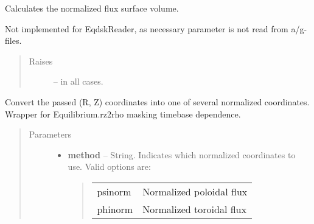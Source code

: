 \documentclass[letterpaper,10pt,english]{sphinxmanual}
\begin{document}
\begin{fulllineitems}
\begin{fulllineitems}
\begin{quote}
\begin{description}
\end{description}
\end{quote}

\end{fulllineitems}


\begin{fulllineitems}
\label{eqtools:eqtools.eqdskreader.EqdskReader.rz2volnorm}
Calculates the normalized flux surface volume.

Not implemented for EqdskReader, as necessary parameter
is not read from a/g-files.
\begin{quote}\begin{description}
\item[{Raises}] \leavevmode
{} -- 
in all cases.

\end{description}\end{quote}

\end{fulllineitems}


\begin{fulllineitems}
\label{eqtools:eqtools.eqdskreader.EqdskReader.rz2rho}
Convert the passed (R, Z) coordinates into one of several normalized coordinates.
Wrapper for Equilibrium.rz2rho masking timebase dependence.
\begin{quote}\begin{description}
\item[{Parameters}] \leavevmode\begin{itemize}
\item {} 
\textbf{method} --
String.
Indicates which normalized coordinates to use.
Valid options are:
\begin{quote}

\begin{tabulary}{\linewidth}{|L|L|}
\hline

psinorm
 & 
Normalized poloidal flux
\\

phinorm
 & 
Normalized toroidal flux
\\


\end{tabulary}
\end{quote}
\end{itemize}
\end{description}
\end{quote}
\end{fulllineitems}
\end{fulllineitems}
\end{document}
